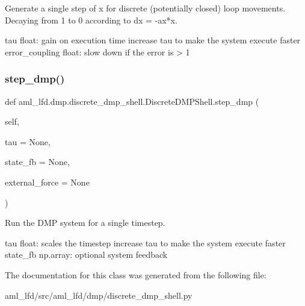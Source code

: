 \begin{DoxyVerb}Generate a single step of x for discrete
(potentially closed) loop movements. 
Decaying from 1 to 0 according to dx = -ax*x.

tau float: gain on execution time
   increase tau to make the system execute faster
error_coupling float: slow down if the error is > 1
\end{DoxyVerb}
 \hypertarget{classaml__lfd_1_1dmp_1_1discrete__dmp__shell_1_1_discrete_d_m_p_shell_a198fd652ccf7f3d54a77361f521ca3ae}{}\label{classaml__lfd_1_1dmp_1_1discrete__dmp__shell_1_1_discrete_d_m_p_shell_a198fd652ccf7f3d54a77361f521ca3ae} 
\subsubsection{\texorpdfstring{step\+\_\+dmp()}{step\_dmp()}}
{\footnotesize\ttfamily def aml\+\_\+lfd.\+dmp.\+discrete\+\_\+dmp\+\_\+shell.\+Discrete\+D\+M\+P\+Shell.\+step\+\_\+dmp (\begin{DoxyParamCaption}\item[{}]{self,  }\item[{}]{tau = {\ttfamily None},  }\item[{}]{state\+\_\+fb = {\ttfamily None},  }\item[{}]{external\+\_\+force = {\ttfamily None} }\end{DoxyParamCaption})}

\begin{DoxyVerb}Run the DMP system for a single timestep.

       tau float: scales the timestep
  increase tau to make the system execute faster
       state_fb np.array: optional system feedback
\end{DoxyVerb}
 

The documentation for this class was generated from the following file\+:\begin{DoxyCompactItemize}
\item 
aml\+\_\+lfd/src/aml\+\_\+lfd/dmp/discrete\+\_\+dmp\+\_\+shell.\+py\end{DoxyCompactItemize}
